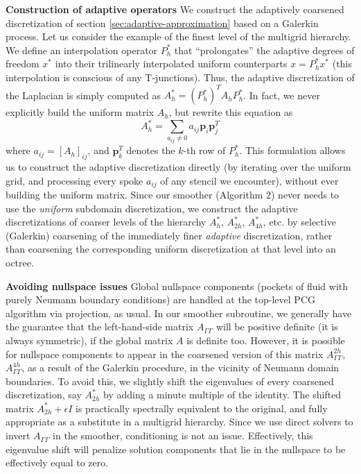 \textbf{Construction of adaptive operators} We construct the adaptively coarsened discretization of section \ref{sec:adaptive-approximation} based on a Galerkin
process. Let us consider the example of the finest level of the multigrid hierarchy. We define an interpolation operator $P^\ast_h$ that ``prolongates'' the adaptive
degrees of freedom $x^\ast$ into their trilinearly interpolated uniform counterparts $x=P^\ast_hx^\ast$ (this interpolation is conscious of any T-junctions). Thus,
the adaptive discretization of the Laplacian is simply computed as $A_h^\ast=(P^\ast_h)^TA_hP^\ast_h$. In fact, we never explicitly build the uniform matrix $A_h$,
but rewrite this equation as
$$
A_h^\ast=\sum_{a_{ij}\ne 0}a_{ij}\mathbf{p}_i\mathbf{p}_j^T
$$
where $a_{ij}=[A_h]_{ij}$, and $\mathbf{p}_k^T$ denotes the $k$-th row of $P^\ast_h$. This formulation allows us to construct the adaptive discretization directly
(by iterating over the uniform grid, and processing every spoke $a_{ij}$ of any stencil we encounter), without ever building the uniform matrix. Since our smoother
(Algorithm 2) never needs to use the \emph{uniform} subdomain discretization, we construct the adaptive discretizations of coarser levels of the hierarchy 
$A_h^\ast$, $A_{2h}^\ast$, $A_{4h}^\ast$, etc. by selective (Galerkin) coarsening of the immediately finer \emph{adaptive} discretization, rather than coarsening the
corresponding uniform discretization at that level into an octree.

\textbf{Avoiding nullspace issues} Global nullspace components (pockets of fluid with purely Neumann boundary conditions) are handled at the top-level PCG algorithm
via projection, as usual. In our smoother subroutine, we generally have the guarantee that the left-hand-side matrix $A_{\Gamma\Gamma}$ will be positive definite (it
is always symmetric), if the global matrix $A$ is definite too. However, it is possible for nullspace components to appear in the coarsened version of this matrix
$A_{\Gamma\Gamma}^{2h}$, $A_{\Gamma\Gamma}^{4h}$, as a result of the Galerkin procedure, in the vicinity of Neumann domain boundaries. To avoid this, we slightly
shift the eigenvalues of every coarsened discretization, say $A_{2h}^\ast$ by adding a minute multiple of the identity. The shifted matrix $A_{2h}^\ast+\epsilon I$
is practically spectrally equivalent to the original, and fully appropriate as a substitute in a multigrid hierarchy. Since we use direct solvers to invert
$A_{\Gamma\Gamma}$ in the smoother, conditioning is not an issue. Effectively, this eigenvalue shift will penalize solution components that lie in the nullspace to
be effectively equal to zero.

